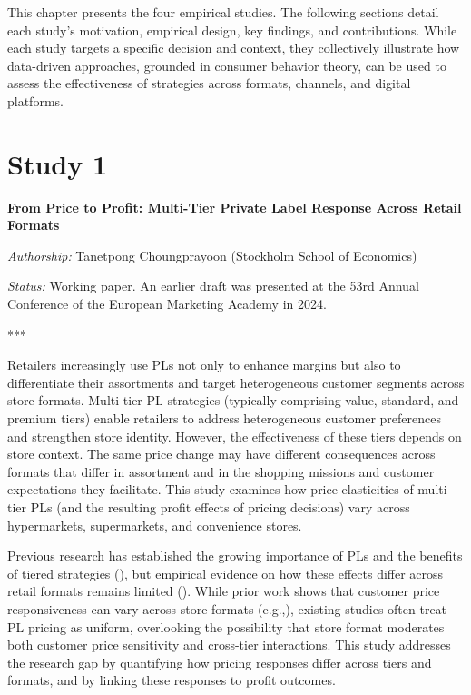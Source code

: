 This chapter presents the four empirical studies. The following sections detail each study’s motivation, empirical design, key findings, and contributions. While each study targets a specific decision and context, they collectively illustrate how data-driven approaches, grounded in consumer behavior theory, can be used to assess the effectiveness of strategies across formats, channels, and digital platforms.

\section{Study 1}

\textbf{From Price to Profit: Multi-Tier Private Label Response Across Retail Formats}

\noindent
\textit{Authorship:} Tanetpong Choungprayoon (Stockholm School of Economics)

\noindent
\textit{Status:} Working paper. An earlier draft was presented at the 53rd Annual Conference of the European Marketing Academy in 2024.

\noindent
***

Retailers increasingly use PLs not only to enhance margins but also to differentiate their assortments and target heterogeneous customer segments across store formats. Multi-tier PL strategies (typically comprising value, standard, and premium tiers) enable retailers to address heterogeneous customer preferences and strengthen store identity. However, the effectiveness of these tiers depends on store context. The same price change may have different consequences across formats that differ in assortment and in the shopping missions and customer expectations they facilitate. This study examines how price elasticities of multi-tier PLs (and the resulting profit effects of pricing decisions) vary across hypermarkets, supermarkets, and convenience stores.

Previous research has established the growing importance of PLs and the benefits of tiered strategies (\cite{Ailawadi2008-zy,Geyskens2010-bx}), but empirical evidence on how these effects differ across retail formats remains limited (\cite{Keller2022-tz}). While prior work shows that customer price responsiveness can vary across store formats (e.g.,\cite{Haans2011-cv}), existing studies often treat PL pricing as uniform, overlooking the possibility that store format moderates both customer price sensitivity and cross-tier interactions. This study addresses the research gap by quantifying how pricing responses differ across tiers and formats, and by linking these responses to profit outcomes.

